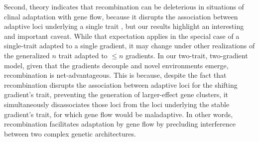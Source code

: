 \documentclass[9pt,twocolumn,twoside,lineno]{pnas-new}
\begin{document}
Second, theory indicates that recombination can be deleterious
in situations of clinal adaptation
with gene flow, because it disrupts the association between adaptive loci 
underlying a single trait \cite{tigano},
but our results highlight an interesting and important caveat.
While that expectation applies in the special case of a single-trait 
adapted to a single gradient,
it may change under other realizations of the 
generalized $n$ trait adapted to $\leq n$ gradients.
In our two-trait, two-gradient model, given that the gradients decouple
and novel environments emerge,
recombination is net-advantageous.
This is because, despite the fact that recombination disrupts the association between
adaptive loci for the shifting gradient's trait, preventing the
generation of larger-effect gene clusters,
it simultaneously disassociates those loci from the loci underlying
the stable gradient's trait, for which gene flow would be maladaptive.
In other words, recombination facilitates adaptation by gene flow
by precluding interference between two complex genetic architectures.
  
\end{document}
